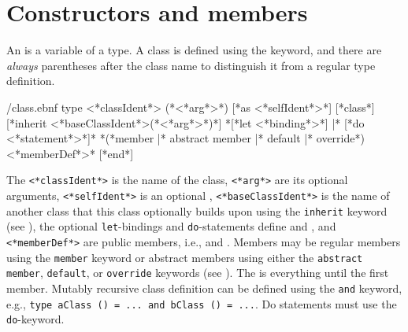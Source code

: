 \section{Constructors and members}
\label{sec:constructor}
An  is a variable of a  type. A class is defined using the  keyword, and there are \emph{always} parentheses after the class name to distinguish it from a regular type definition.%
%
%
%
\begin{verbatimwrite}{\ebnf/class.ebnf}
type <*classIdent*> ({*<*arg*>*}) [*as <*selfIdent*>*] 
  [*class*]
  [*inherit <*baseClassIdent*>({*<*arg*>*})*]
  {*[*let <*binding*>*] |* [*do <*statement*>*]*}
  {*(*member |* abstract member |* default |* override*) <*memberDef*>*}
  [*end*]
\end{verbatimwrite}
%
The \lstinline[language=syntax]{<*classIdent*>} is the name of the class, \lstinline[language=syntax]{<*arg*>} are its optional arguments, \lstinline[language=syntax]{<*selfIdent*>} is an optional , \lstinline[language=syntax]{<*baseClassIdent*>} is the name of another class that this class optionally builds upon using the \lstinline{inherit} keyword (see ), the optional \lstinline{let}-bindings and \lstinline{do}-statements define  and , and \lstinline[language=syntax]{<*memberDef*>} are public members, i.e.,  and . Members may be regular members using the \lstinline{member} keyword or abstract members using either the \lstinline{abstract member}, \lstinline{default}, or \lstinline{override} keywords (see ). The  is everything until the first member. Mutably recursive class definition can be defined using the \lstinline{and} keyword, e.g., \lstinline{type aClass () = ... and bClass () = ...}. Do statements must use the \lstinline{do}-keyword.

